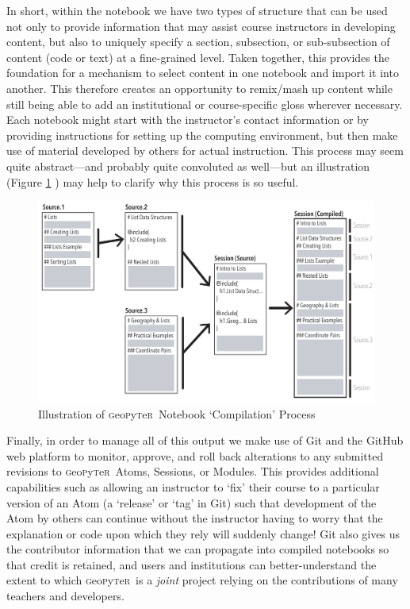 \documentclass[letter, 11pt,titlepage]{article}
\newcommand{\gp}{\textsc{g}eo\textsc{p}y\textsc{t}e\textsc{r}~\/}
\begin{document}
In short, within the notebook we have two types of structure that can be used
not only to provide information that may assist course instructors in developing
content, but also to uniquely specify a section, subsection, or sub-subsection
of content (code or text) at a fine-grained level. Taken together, this provides
the foundation for a mechanism to select content in one notebook and import it
into another. This therefore creates an opportunity to remix/mash up content
while still being able to add an institutional or course-specific gloss wherever
necessary. Each notebook might start with the instructor's contact information
or by providing instructions for setting up the computing environment, but then
make use of material developed by others for actual instruction. This process
may seem quite abstract---and probably quite convoluted as well---but an
illustration (Figure \ref{fig:Illustration} )
may help to clarify why this process is so useful.

\begin{figure}[hbtp]
  \centering
  \includegraphics[width=\textwidth, angle=0]{Multiple_Documents.pdf}
  \caption{Illustration of \gp Notebook `Compilation' Process}
  \label{fig:Illustration}
\end{figure}

Finally, in order to manage all of this output we make use of Git and the GitHub
web platform to monitor, approve, and roll back alterations to any submitted
revisions to \gp Atoms, Sessions, or Modules. This provides additional
capabilities such as allowing an instructor to `fix' their course to a
particular version of an Atom (a `release' or `tag' in Git) such that
development of the Atom by others can continue without the instructor having to
worry that the explanation or code upon which they rely will suddenly change!
Git also gives us the contributor information that we can propagate into
compiled notebooks so that credit is retained, and users and institutions can
better-understand the extent to which \gp is a \emph{joint} project relying on
the contributions of many teachers and developers.
\end{document}
